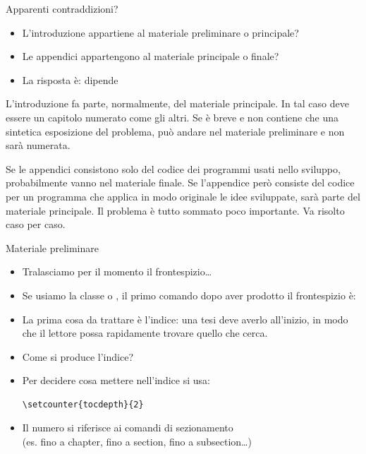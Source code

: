 \documentclass{beamer}
\begin{document}
\begin{frame}{Apparenti contraddizioni?}
\begin{itemize}
\item L'introduzione appartiene al materiale preliminare o principale?
\item Le appendici appartengono al materiale principale o finale?
\item La risposta \`e: \alert{dipende}
\end{itemize}
\bigskip
\small
L'introduzione fa parte, normalmente, del materiale principale. In tal caso deve essere un
capitolo numerato come gli altri. Se \`e breve e non contiene che una sintetica esposizione del problema, pu\`o andare nel materiale preliminare e non sar\`a numerata.

\bigskip
Se le appendici consistono solo del codice dei programmi usati nello sviluppo,
probabilmente vanno nel materiale finale. Se l'appendice però consiste del codice per un
programma che applica in modo originale le idee sviluppate, sar\`a parte del materiale
principale. Il problema \`e tutto sommato poco importante. Va risolto caso per caso.\end{frame}

\begin{frame}[fragile]{Materiale preliminare}

\begin{itemize}
\item Tralasciamo per il momento il frontespizio\ldots
\item Se usiamo la classe  o , il primo comando dopo aver prodotto il frontespizio \`e:
\begin{center}
\Large{}
\end{center}
\item La prima cosa da trattare \`e l'indice: una tesi deve averlo all'inizio, in modo che il lettore possa rapidamente trovare quello che cerca.
\item Come si produce l'indice?
\begin{center}
\Large{}
\end{center}
\item Per decidere cosa mettere nell'indice si usa:
\begin{verbatim}
\setcounter{tocdepth}{2}
\end{verbatim}
\item Il numero si riferisce ai comandi di sezionamento\\(es.  fino a chapter,  fino a section,  fino a subsection\ldots)

\end{itemize}


\end{frame}
\end{document}
